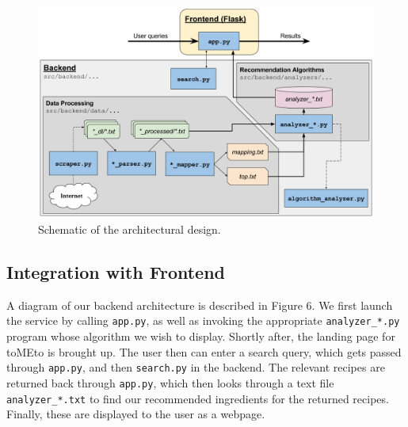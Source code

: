 \documentclass{acm_proc_article-sp}
\begin{document}
\begin{figure}[t]
	\centering
	\includegraphics[width=\textwidth]{architecture}
	\caption{Schematic of the architectural design.}
	\label{fig:}
\end{figure}

\subsection{Integration with Frontend}
A diagram of our backend architecture is described in Figure 6. We first launch the service by calling \texttt{app.py}, as well as invoking the appropriate \texttt{analyzer\_*.py} program whose algorithm we wish to display. Shortly after, the landing page for toMEto is brought up. The user then can enter a search query,
which gets passed through \texttt{app.py}, and then \texttt{search.py} in the backend. The relevant
recipes are returned back through \texttt{app.py}, which then looks through a text file \texttt{analyzer\_*.txt} to find our recommended ingredients for the returned recipes. Finally, these are displayed to the user 
 as a webpage.
\end{document}

